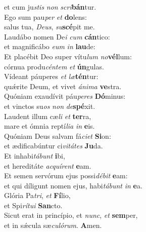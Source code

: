 \oddverse et cum ju\textit{stis} \textit{non} \textit{scri}\textbf{bán}tur.\\
\evenverse Ego sum pau\textit{per} \textit{et} \textbf{do}lens:~\*\\
\evenverse salus tua, \textit{De}\textit{us}, \textit{su}\textbf{scé}pit me.\\
\oddverse Laudábo nomen De\textit{i} \textit{cum} \textbf{cán}tico:~\*\\
\oddverse et magnificábo \textit{e}\textit{um} \textit{in} \textbf{lau}de:\\
\evenverse Et placébit Deo super vítu\textit{lum} \textit{no}\textbf{vél}lum:~\*\\
\evenverse córnua produ\textit{cén}\textit{tem} \textit{et} \textbf{ún}gulas.\\
\oddverse Vídeant páuperes \textit{et} \textit{læ}\textbf{tén}tur:~\*\\
\oddverse quǽrite Deum, et vivet \textit{á}\textit{ni}\textit{ma} \textbf{ve}stra.\\
\evenverse Quóniam exaudívit páu\textit{pe}\textit{res} \textbf{Dó}minus:~\*\\
\evenverse et vinctos su\textit{os} \textit{non} \textit{de}\textbf{spé}xit.\\
\oddverse Laudent illum cæ\textit{li} \textit{et} \textbf{ter}ra,~\*\\
\oddverse mare et ómnia reptí\textit{li}\textit{a} \textit{in} \textbf{e}is.\\
\evenverse Quóniam Deus salvam fá\textit{ci}\textit{et} \textbf{Si}on:~\*\\
\evenverse et ædificabúntur ci\textit{vi}\textit{tá}\textit{tes} \textbf{Ju}da.\\
\oddverse Et inhabi\textit{tá}\textit{bunt} \textbf{i}bi,~\*\\
\oddverse et hereditáte \textit{ac}\textit{quí}\textit{rent} \textbf{e}am.\\
\evenverse Et semen servórum ejus possi\textit{dé}\textit{bit} \textbf{e}am:~\*\\
\evenverse et qui díligunt nomen ejus, habi\textit{tá}\textit{bunt} \textit{in} \textbf{e}a.\\
\oddverse Glória Pa\textit{tri}, \textit{et} \textbf{Fí}lio,~\*\\
\oddverse et Spi\textit{rí}\textit{tu}\textit{i} \textbf{San}cto.\\
\evenverse Sicut erat in princípio, et \textit{nunc}, \textit{et} \textbf{sem}per,~\*\\
\evenverse et in sǽcula sæ\textit{cu}\textit{ló}\textit{rum}. \textbf{A}men.\\
